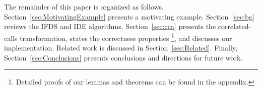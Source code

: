 The remainder of this paper is organized as follows.
%
Section~\ref{sec:MotivatingExample} presents a motivating example.
%
Section~\ref{sec:bg} reviews the IFDS and IDE algorithms.
%
Section~\ref{sec:cca} presents the correlated-calls transformation, 
states the correctness properties%
\footnote{
  Detailed proofs of our lemmas and theorems can be found in
  the appendix.
}, and discusses our implementation.
%
%
Related work is discussed in Section~\ref{sec:Related}.
%
Finally, Section~\ref{sec:Conclusions} presents conclusions and directions for future work.

 
 
